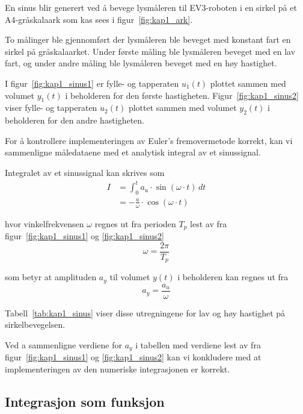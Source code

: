 \documentclass[main.tex]{subfiles}
\begin{document}
En sinus blir generert ved å bevege lysmåleren til \textsc{EV3}-roboten i en sirkel på et A4-gråskalaark som kas sees i figur~\ref{fig:kap1_ark}.



To målinger ble gjennomført der lysmåleren ble beveget med konstant fart en sirkel på gråskalaarket. Under første måling ble lysmåleren beveget med en lav fart, og under andre måling ble lysmåleren beveget med en høy hastighet.

I figur~\ref{fig:kap1_sinus1} er fylle- og tapperaten $u_1(t)$ plottet sammen med volumet $y_1(t)$ i beholderen for den første hastigheten. Figur~\ref{fig:kap1_sinus2} viser fylle- og tapperaten $u_2(t)$ plottet sammen med volumet $y_2(t)$ i beholderen for den andre hastigheten.





For å kontrollere implementeringen av Euler's fremovermetode korrekt, kan vi sammenligne måledataene med et analytisk integral av et sinussignal.

Integralet av et sinussignal kan skrives som
\begin{align}
    I & = \int_{0}^{t} a_u \cdot \sin{(\omega \cdot t)} \, dt \nonumber \\
      & = -\frac{a}{\omega} \cdot \cos{(\omega \cdot t)}
\end{align}

hvor vinkelfrekvensen $\omega$ regnes ut fra perioden $T_p$ lest av fra figur~\ref{fig:kap1_sinus1} og \ref{fig:kap1_sinus2}
\begin{equation}
    \omega = \frac{2\pi}{T_p}
\end{equation}

som betyr at amplituden $a_y$ til volumet $y(t)$ i beholderen kan regnes ut fra
\begin{equation}
    a_y = \frac{a_u}{\omega}
\end{equation}

Tabell~\ref{tab:kap1_sinus} viser disse utregningene for lav og høy hastighet på sirkelbevegelsen.



Ved a sammenligne verdiene for $a_y$ i tabellen med verdiene lest av fra figur~\ref{fig:kap1_sinus1} og \ref{fig:kap1_sinus2} kan vi konkludere med at implementeringen av den numeriske integrasjonen er korrekt.

\subsection{Integrasjon som funksjon}
\end{document}
